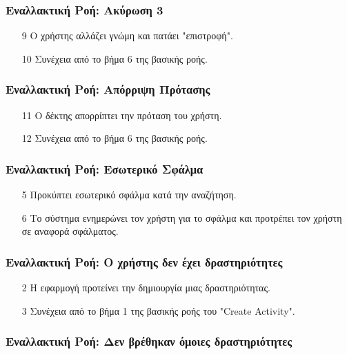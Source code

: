 \documentclass[11pt]{article}
\begin{document}
\subsubsection{Εναλλακτική Ροή: Ακύρωση 3}

\begin{enumerate}
    \item[9] Ο χρήστης αλλάζει γνώμη και πατάει "επιστροφή".
    \item[10] Συνέχεια από το βήμα 6 της βασικής ροής.
\end{enumerate}

\subsubsection{Εναλλακτική Ροή: Απόρριψη Πρότασης}

\begin{enumerate}
    \item[11] Ο δέκτης απορρίπτει την πρόταση του χρήστη.
    \item[12] Συνέχεια από το βήμα 6 της βασικής ροής.
\end{enumerate}



\subsubsection{Εναλλακτική Ροή: Εσωτερικό Σφάλμα}

\begin{enumerate}
    \item[5] Προκύπτει εσωτερικό σφάλμα κατά την αναζήτηση.
    \item[6] Το σύστημα ενημερώνει τον χρήστη για το σφάλμα και προτρέπει τον
        χρήστη σε αναφορά σφάλματος.
\end{enumerate}

\subsubsection{Εναλλακτική Ροή: Ο χρήστης δεν έχει δραστηριότητες}

\begin{enumerate}
    \item[2] Η εφαρμογή προτείνει την δημιουργία μιας δραστηριότητας.
    \item[3] Συνέχεια από το βήμα 1 της βασικής ροής του "Create Activity".
\end{enumerate}

\subsubsection{Εναλλακτική Ροή: Δεν βρέθηκαν όμοιες δραστηριότητες}
\end{document}
